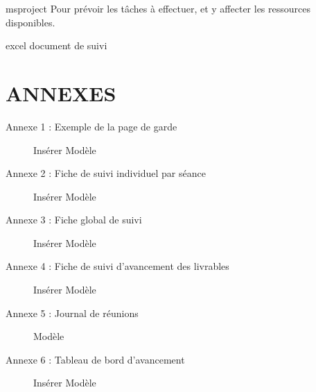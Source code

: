 msproject
Pour prévoir les tâches à effectuer, et y affecter les ressources disponibles.

excel document de suivi



\section{ANNEXES}
\begin{description}
\item[Annexe 1 : Exemple de la page de garde]
    {Insérer Modèle}
\item[Annexe 2 : Fiche de suivi individuel par séance]
    Insérer Modèle
\item[Annexe 3 : Fiche global de suivi]
    Insérer Modèle
\item[Annexe 4 : Fiche de suivi d'avancement des livrables]
    Insérer Modèle
\item[Annexe 5 : Journal de réunions]
    Modèle
\item[Annexe 6 : Tableau de bord d'avancement]
    Insérer Modèle
\end{description}
